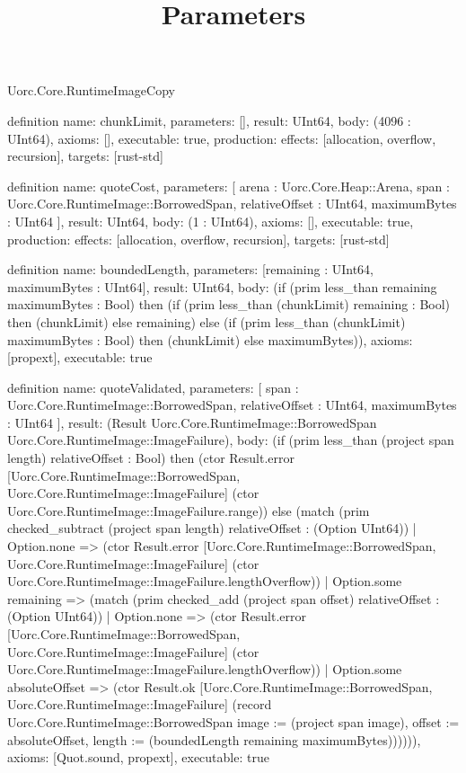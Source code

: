 \begin{lexlean}{Uorc.Core.RuntimeImageCopy}
\title{Parameters}
\begin{semanticmodule}
definition{
  name: chunkLimit,
  parameters: [],
  result: UInt64,
  body: (4096 : UInt64),
  axioms: [],
  executable: true,
  production: {effects: [allocation, overflow, recursion], targets: [rust-std]}
}

definition{
  name: quoteCost,
  parameters: [
    arena : Uorc.Core.Heap::Arena,
    span : Uorc.Core.RuntimeImage::BorrowedSpan,
    relativeOffset : UInt64,
    maximumBytes : UInt64
  ],
  result: UInt64,
  body: (1 : UInt64),
  axioms: [],
  executable: true,
  production: {effects: [allocation, overflow, recursion], targets: [rust-std]}
}

definition{
  name: boundedLength,
  parameters: [remaining : UInt64, maximumBytes : UInt64],
  result: UInt64,
  body: (if (prim less_than remaining maximumBytes : Bool) then (if (prim less_than (chunkLimit) remaining : Bool) then (chunkLimit) else remaining) else (if (prim less_than (chunkLimit) maximumBytes : Bool) then (chunkLimit) else maximumBytes)),
  axioms: [propext],
  executable: true
}

definition{
  name: quoteValidated,
  parameters: [
    span : Uorc.Core.RuntimeImage::BorrowedSpan,
    relativeOffset : UInt64,
    maximumBytes : UInt64
  ],
  result: (Result Uorc.Core.RuntimeImage::BorrowedSpan Uorc.Core.RuntimeImage::ImageFailure),
  body: (if (prim less_than (project span length) relativeOffset : Bool) then (ctor Result.error [Uorc.Core.RuntimeImage::BorrowedSpan, Uorc.Core.RuntimeImage::ImageFailure] (ctor Uorc.Core.RuntimeImage::ImageFailure.range)) else (match (prim checked_subtract (project span length) relativeOffset : (Option UInt64))
    | Option.none => (ctor Result.error [Uorc.Core.RuntimeImage::BorrowedSpan, Uorc.Core.RuntimeImage::ImageFailure] (ctor Uorc.Core.RuntimeImage::ImageFailure.lengthOverflow))
    | Option.some remaining => (match (prim checked_add (project span offset) relativeOffset : (Option UInt64))
      | Option.none => (ctor Result.error [Uorc.Core.RuntimeImage::BorrowedSpan, Uorc.Core.RuntimeImage::ImageFailure] (ctor Uorc.Core.RuntimeImage::ImageFailure.lengthOverflow))
      | Option.some absoluteOffset => (ctor Result.ok [Uorc.Core.RuntimeImage::BorrowedSpan, Uorc.Core.RuntimeImage::ImageFailure] (record Uorc.Core.RuntimeImage::BorrowedSpan {image := (project span image), offset := absoluteOffset, length := (boundedLength remaining maximumBytes)}))))),
  axioms: [Quot.sound, propext],
  executable: true
}


\end{semanticmodule}
\end{lexlean}
